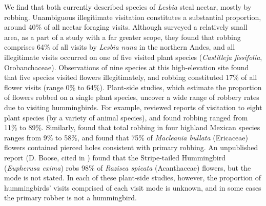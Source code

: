 \documentclass[fleqn,10pt,lineno]{wlpeerj}
\begin{document}
%
%
We find that both currently described species of \textit{Lesbia} steal nectar, mostly by robbing. 
Unambiguous illegitimate visitation constitutes a substantial proportion, around 40\% of all nectar foraging visits. 
Although \citet{snow1980} surveyed a relatively small area, as a part of a study with a far greater scope, they found that robbing comprises 64\% of all visits by \textit{Lesbia nuna} in the northern Andes, and all illegitimate visits occurred on one of five visited plant species (\textit{Castilleja fissifolia}, Orobanchaceae).
Observations of nine species at this high-elevation site found that five species visited flowers illegitimately, and robbing constituted 17\% of all flower visits (range 0\% to 64\%).
Plant-side studies, which estimate the proportion of flowers robbed on a single plant species, uncover a wide range of robbery rates due to visiting hummingbirds.
For example, \citet{maloof2000} reviewed reports of visitation to eight plant species (by a variety of animal species), and found robbing ranged from 11\% to 89\%.
Similarly, \citet{arizmendi2001} found that total robbing in four highland Mexican species ranges from 9\% to 58\%, and \citet{navarro2001} found that 75\% of \textit{Macleania bullata} (Ericaceae) flowers contained pierced holes consistent with primary robbing.
An unpublished report (D. Boose, cited in \citealt{maloof2000}) found that the Stripe-tailed Hummingbird (\textit{Eupherusa exima}) robs 98\% of \textit{Razisea spicata} (Acanthaceae) flowers, but the mode is not stated. 
In each of these plant-side studies, however, the proportion of hummingbirds' visits comprised of each visit mode is unknown, and in some cases the primary robber is not a hummingbird. %
\end{document}
